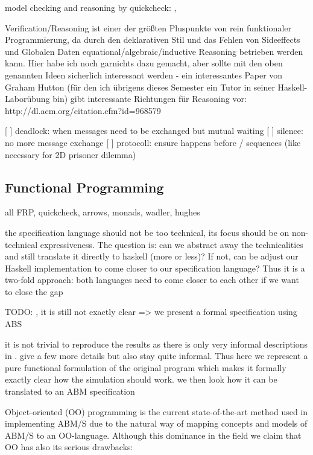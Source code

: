 model checking and reasoning by quickcheck: \cite{claessen_quickcheck:_2000}, \cite{hutton_tutorial_1999}

Verification/Reasoning ist einer der größten Pluspunkte von rein funktionaler Programmierung, da durch den deklarativen Stil und das Fehlen von Sideeffects und Globalen Daten equational/algebraic/inductive Reasoning betrieben werden kann. Hier habe ich noch garnichts dazu gemacht, aber sollte mit den oben genannten Ideen sicherlich interessant werden - ein interessantes Paper von Graham Hutton (für den ich übrigens dieses Semester ein Tutor in seiner Haskell-Laborübung bin) gibt interessante Richtungen für Reasoning vor: http://dl.acm.org/citation.cfm?id=968579

[ ] deadlock: when messages need to be exchanged but mutual waiting
[ ] silence: no more message exchange
[ ] protocoll: ensure happens before / sequences (like necessary for 2D prisoner dilemma)

\subsection{Functional Programming}
all FRP, quickcheck, arrows, monads, wadler, hughes

 the specification language should not be too technical, its focus should be on non-technical expressiveness. The question is: can we abstract away the technicalities and still translate it directly to haskell (more or less)? If not, can be adjust our Haskell implementation to come closer to our specification language? Thus it is a two-fold approach: both languages need to come closer to each other if we want to close the gap
 
TODO: \cite{nowak_evolutionary_1992}, \cite{huberman_evolutionary_1993}
it is still not exactly clear => we present a formal specification using ABS 

it is not trivial to reproduce the results as there is only very informal descriptions in \cite{nowak_evolutionary_1992}. \cite{huberman_evolutionary_1993} give a few more details but also stay quite informal. Thus here we represent a pure functional formulation of the original program which makes it formally exactly clear how the simulation should work. we then look how it can be translated to an ABM specification

Object-oriented (OO) programming is the current state-of-the-art method used in implementing ABM/S due to the natural way of mapping concepts and models of ABM/S to an OO-language. Although this dominance in the field we claim that OO has also its serious drawbacks:


